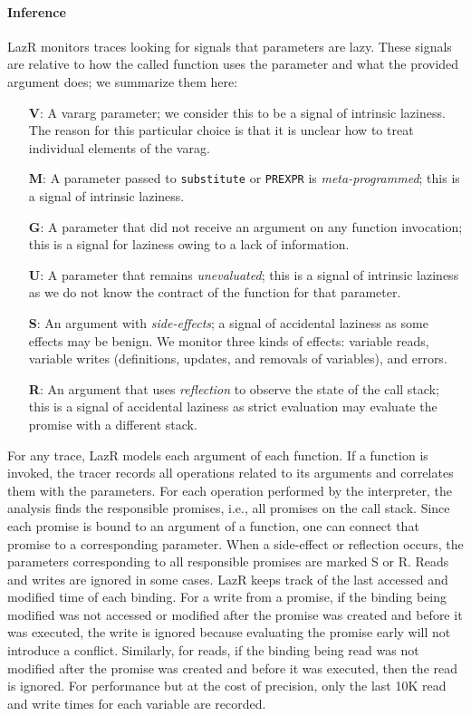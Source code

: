 \documentclass[screen,acmsmall]{acmart}
\renewcommand{\c}[1]{\lstinline |#1|\xspace}
\newcommand{\lazr}{{\sf LazR}\xspace}
\begin{document}
\paragraph{Inference}
\lazr monitors traces looking for signals that parameters are lazy. These
signals are relative to how the called function uses the parameter and what the
provided argument does; we summarize them here:
\begin{itemize}
\item[{\bf V}:] A vararg parameter; we consider this to be a signal of intrinsic
  laziness. The reason for this particular choice is that it is unclear how to
  treat individual elements of the varag.
\item[{\bf M}:] A parameter passed to \c{substitute} or \c{PREXPR} is
  \emph{meta-programmed}; this is a signal of intrinsic laziness.
\item[{\bf G}:] A parameter that did not receive an argument on any function
  invocation; this is a signal for laziness owing to a lack of information.
\item[{\bf U}:] A parameter that remains \emph{unevaluated}; this is a
  signal of intrinsic laziness as we do not know the contract of the function
  for that parameter.
\item [{\bf S}:] An argument with \emph{side-effects}; a signal of
  accidental laziness as some effects may be benign. We monitor three kinds of
  effects: variable reads, variable writes (definitions, updates, and removals
  of variables), and errors.
\item[{\bf R}:] An argument that uses \emph{reflection} to observe the state of
  the call stack; this is a signal of accidental laziness as strict evaluation
  may evaluate the promise with a different stack.
\end{itemize}

For any trace, \lazr models each argument of each function. If a function is
invoked, the tracer records all operations related to its arguments and
correlates them with the parameters. For each operation performed by the
interpreter, the analysis finds the responsible promises, i.e., all promises on
the call stack. Since each promise is bound to an argument of a function, one
can connect that promise to a corresponding parameter. When a side-effect or
reflection occurs, the parameters corresponding to all responsible promises are
marked S or R. Reads and writes are ignored in some cases. \lazr keeps track of
the last accessed and modified time of each binding. For a write from a promise,
if the binding being modified was not accessed or modified after the promise was
created and before it was executed, the write is ignored because evaluating the
promise early will not introduce a conflict. Similarly, for reads, if the
binding being read was not modified after the promise was created and before it
was executed, then the read is ignored. For performance but at the cost of
precision, only the last 10K read and write times for each variable are
recorded.
\end{document}
